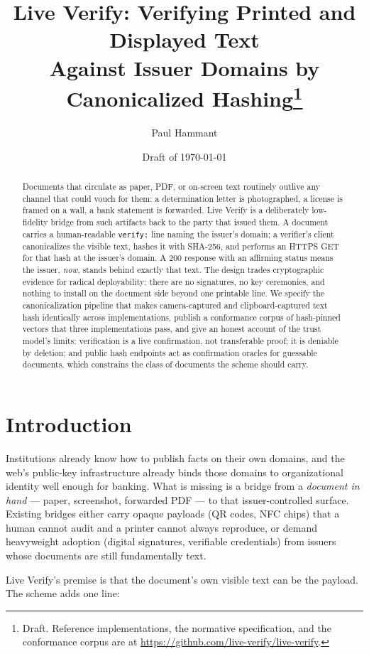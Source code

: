 \documentclass[11pt]{article}
\title{Live Verify: Verifying Printed and Displayed Text\\
Against Issuer Domains by Canonicalized Hashing\thanks{Draft. Reference
implementations, the normative specification, and the conformance corpus are at
\url{https://github.com/live-verify/live-verify}.}}
\author{Paul Hammant}
\date{Draft of \today}
\begin{document}
\maketitle

\begin{abstract}
Documents that circulate as paper, PDF, or on-screen text routinely outlive any
channel that could vouch for them: a determination letter is photographed, a
license is framed on a wall, a bank statement is forwarded. Live Verify is a
deliberately low-fidelity bridge from such artifacts back to the party that
issued them. A document carries a human-readable \texttt{verify:} line naming
the issuer's domain; a verifier's client canonicalizes the visible text,
hashes it with SHA-256, and performs an HTTPS GET for that hash at the issuer's
domain. A 200 response with an affirming status means the issuer, \emph{now},
stands behind exactly that text. The design trades cryptographic evidence for
radical deployability: there are no signatures, no key ceremonies, and nothing
to install on the document side beyond one printable line. We specify the
canonicalization pipeline that makes camera-captured and clipboard-captured
text hash identically across implementations, publish a conformance corpus of
hash-pinned vectors that three implementations pass, and give an honest
account of the trust model's limits: verification is a live confirmation, not
transferable proof; it is deniable by deletion; and public hash endpoints act
as confirmation oracles for guessable documents, which constrains the class of
documents the scheme should carry.
\end{abstract}

\section{Introduction}

Institutions already know how to publish facts on their own domains, and the
web's public-key infrastructure already binds those domains to organizational
identity well enough for banking. What is missing is a bridge from a
\emph{document in hand} --- paper, screenshot, forwarded PDF --- to that
issuer-controlled surface. Existing bridges either carry opaque payloads (QR
codes, NFC chips) that a human cannot audit and a printer cannot always
reproduce, or demand heavyweight adoption (digital signatures, verifiable
credentials) from issuers whose documents are still fundamentally text.

Live Verify's premise is that the document's own visible text can be the
payload. The scheme adds one line:
\end{document}
